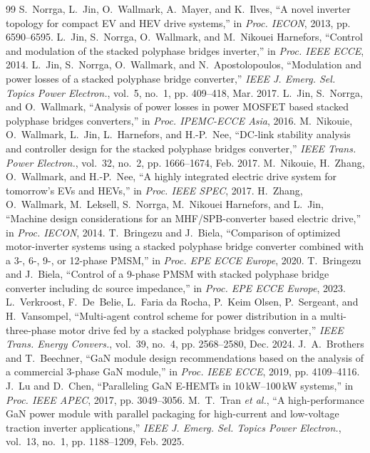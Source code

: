 \documentclass[conference]{IEEEtran}
\begin{document}
\begin{thebibliography}{99}
 S.~Norrga, L.~Jin, O.~Wallmark, A.~Mayer, and K.~Ilves, ``A novel inverter topology for compact EV and HEV drive systems,'' in \emph{Proc. IECON}, 2013, pp. 6590--6595.
 L.~Jin, S.~Norrga, O.~Wallmark, and M.~Nikouei Harnefors, ``Control and modulation of the stacked polyphase bridges inverter,'' in \emph{Proc. IEEE ECCE}, 2014.
 L.~Jin, S.~Norrga, O.~Wallmark, and N.~Apostolopoulos, ``Modulation and power losses of a stacked polyphase bridge converter,'' \emph{IEEE J. Emerg. Sel. Topics Power Electron.}, vol.~5, no.~1, pp. 409--418, Mar. 2017.
 L.~Jin, S.~Norrga, and O.~Wallmark, ``Analysis of power losses in power MOSFET based stacked polyphase bridges converters,'' in \emph{Proc. IPEMC-ECCE Asia}, 2016.
 M.~Nikouie, O.~Wallmark, L.~Jin, L.~Harnefors, and H.-P.~Nee, ``DC-link stability analysis and controller design for the stacked polyphase bridges converter,'' \emph{IEEE Trans. Power Electron.}, vol.~32, no.~2, pp. 1666--1674, Feb. 2017.
 M.~Nikouie, H.~Zhang, O.~Wallmark, and H.-P.~Nee, ``A highly integrated electric drive system for tomorrow's EVs and HEVs,'' in \emph{Proc. IEEE SPEC}, 2017.
 H.~Zhang, O.~Wallmark, M.~Leksell, S.~Norrga, M.~Nikouei Harnefors, and L.~Jin, ``Machine design considerations for an MHF/SPB-converter based electric drive,'' in \emph{Proc. IECON}, 2014.
 T.~Bringezu and J.~Biela, ``Comparison of optimized motor-inverter systems using a stacked polyphase bridge converter combined with a 3-, 6-, 9-, or 12-phase PMSM,'' in \emph{Proc. EPE ECCE Europe}, 2020.
 T.~Bringezu and J.~Biela, ``Control of a 9-phase PMSM with stacked polyphase bridge converter including dc source impedance,'' in \emph{Proc. EPE ECCE Europe}, 2023.
 L.~Verkroost, F.~De~Belie, L.~Faria da Rocha, P.~Keim Olsen, P.~Sergeant, and H.~Vansompel, ``Multi-agent control scheme for power distribution in a multi-three-phase motor drive fed by a stacked polyphase bridges converter,'' \emph{IEEE Trans. Energy Convers.}, vol.~39, no.~4, pp. 2568--2580, Dec. 2024.
 J.~A.~Brothers and T.~Beechner, ``GaN module design recommendations based on the analysis of a commercial 3-phase GaN module,'' in \emph{Proc. IEEE ECCE}, 2019, pp. 4109--4116.
 J.~Lu and D.~Chen, ``Paralleling GaN E-HEMTs in 10\,kW--100\,kW systems,'' in \emph{Proc. IEEE APEC}, 2017, pp. 3049--3056.
 M.~T.~Tran \emph{et al.}, ``A high-performance GaN power module with parallel packaging for high-current and low-voltage traction inverter applications,'' \emph{IEEE J. Emerg. Sel. Topics Power Electron.}, vol.~13, no.~1, pp. 1188--1209, Feb. 2025.

\end{thebibliography}
\end{document}

